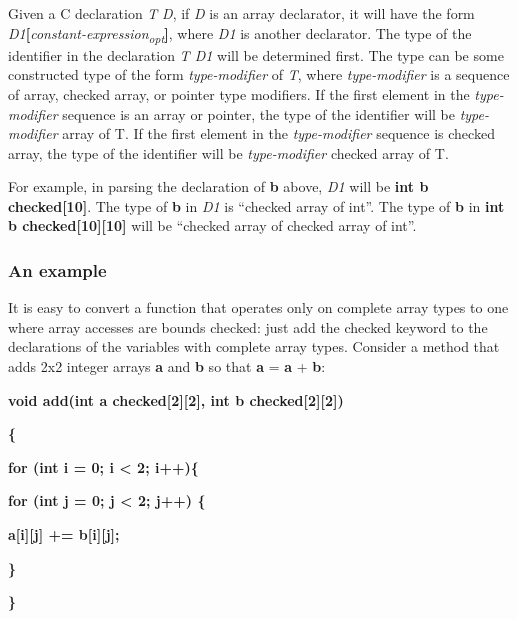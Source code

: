 \documentclass[]{article}
\begin{document}
Given a C declaration \emph{T} \emph{D}, if \emph{D} is an array
declarator, it will have the form
\emph{D1}\textbf{{[}}\emph{constant-expression\textsubscript{opt}}\textbf{{]}},
where \emph{D1} is another declarator. The type of the identifier in the
declaration \emph{T D1} will be determined first. The type can be some
constructed type of the form \emph{type-modifier} of \emph{T}, where
\emph{type-modifier} is a sequence of array, checked array, or pointer
type modifiers. If the first element in the \emph{type-modifier}
sequence is an array or pointer, the type of the identifier will be
\emph{type-modifier} array of T. If the first element in the
\emph{type-modifier} sequence is checked array, the type of the
identifier will be \emph{type-modifier} checked array of T.

For example, in parsing the declaration of \textbf{b} above, \emph{D1}
will be \textbf{int b checked{[}10{]}}. The type of \textbf{b} in
\emph{D1} is ``checked array of int''. The type of \textbf{b} in
\textbf{int b checked{[}10{]}{[}10{]}} will be ``checked array of
checked array of int''.

\subsubsection{\texorpdfstring{\protect\hypertarget{ux5fToc424307679}{}{\protect\hypertarget{ux5fToc426641057}{}{\protect\hypertarget{ux5fToc435434917}{}{\protect\hypertarget{ux5fToc437460738}{}{\protect\hypertarget{ux5fToc440445412}{}{\protect\hypertarget{ux5fToc440449194}{}{\protect\hypertarget{ux5fToc440551844}{}{}}}}}}}An
example}{An example}}\label{an-example}

It is easy to convert a function that operates only on complete array
types to one where array accesses are bounds checked: just add the
checked keyword to the declarations of the variables with complete array
types. Consider a method that adds 2x2 integer arrays \textbf{a} and
\textbf{b} so that \textbf{a} = \textbf{a} + \textbf{b}:

\textbf{void add(int a checked{[}2{]}{[}2{]}, int b
checked{[}2{]}{[}2{]}) }

\textbf{\{}

\textbf{for (int i = 0; i \textless{} 2; i++)\{}

\textbf{for (int j = 0; j \textless{} 2; j++) \{}

\textbf{a{[}i{]}{[}j{]} += b{[}i{]}{[}j{]};}

\textbf{\}}

\textbf{\} }
\end{document}
